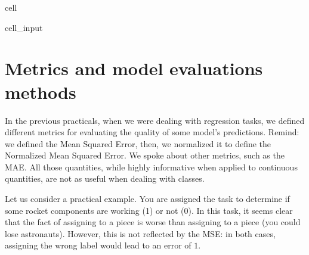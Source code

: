 \documentclass[letterpaper,10pt,english]{jupyterBook}
\begin{document}
\begin{sphinxuseclass}{cell}
\begin{sphinxVerbatimInput}
\begin{sphinxuseclass}{cell_input}
\begin{sphinxVerbatim}[commandchars=\\\{\}]
  \PYG{p}{[} \PYG{p}{]}  \PYG{p}{[} \PYG{p}{]}
   
   
     \PYG{p}{[}\PYG{p}{]}  
        \PYG{p}{[} \PYG{p}{]}    
        \PYG{p}{[} \PYG{p}{]}    
\end{sphinxVerbatim}

\end{sphinxuseclass}\end{sphinxVerbatimInput}

\end{sphinxuseclass}

\section{Metrics and model evaluations methods}
\label{\detokenize{06:metrics-and-model-evaluations-methods}}
\sphinxAtStartPar
In the previous practicals, when we were dealing with regression tasks, we defined different metrics for evaluating the quality of some model’s predictions. Remind: we defined the Mean Squared Error, then, we normalized it to define the Normalized Mean Squared Error. We spoke about other metrics, such as the MAE. All those quantities, while highly informative when applied to continuous quantities, are not as useful when dealing with classes.

\sphinxAtStartPar
Let us consider a practical example. You are assigned the task to determine if some rocket components are working (1) or not (0). In this task, it seems clear that the fact of assigning  to a  piece is worse than assigning  to a  piece (you could lose astronauts). However, this is not reflected by the MSE: in both cases, assigning the wrong label would lead to an error of \(1\).
\end{document}

